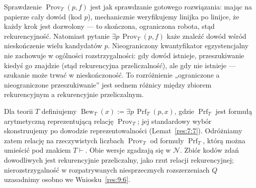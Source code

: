 \begin{przyklad}\label{res:6:6}
Sprawdzenie $\operatorname{Prov}_T(p,f)$ jest jak sprawdzanie gotowego rozwiązania: mając na papierze cały dowód (kod $p$), mechanicznie weryfikujemy linijka po linijce, że każdy krok jest dozwolony --- to skończona, ograniczona robota, stąd rekurencyjność. Natomiast pytanie $\exists p\,\operatorname{Prov}_T(p,f)$ każe znaleźć dowód wśród nieskończenie wielu kandydatów $p$. Nieograniczony kwantyfikator egzystencjalny nie zachowuje w ogólności rozstrzygalności: gdy dowód istnieje, przeszukiwanie kiedyś go znajdzie (stąd rekurencyjna przeliczalność), ale gdy nie istnieje --- szukanie może trwać w nieskończoność. To rozróżnienie „ograniczone a nieograniczone przeszukiwanie” jest sednem różnicy między zbiorem rekurencyjnym a rekurencyjnie przeliczalnym.
\end{przyklad}

\begin{definicja}\label{res:6:7}
Dla teorii $T$ definiujemy $\operatorname{Bew}_T(x):=\exists p\,\operatorname{Prf}_T(p,x)$, gdzie $\operatorname{Prf}_T$ jest formułą arytmetyczną reprezentującą relację $\operatorname{Prov}_T$; jej standardowy wybór skonstruujemy po dowodzie reprezentowalności (Lemat~\ref{res:7:7}). Odróżniamy zatem relację na rzeczywistych liczbach $\operatorname{Prov}_T$ od formuły $\operatorname{Prf}_T$, którą można umieścić pod znakiem $T\vdash$. Obie wersje zgadzają się w $\mathcal N$. Zbiór kodów zdań dowodliwych jest rekurencyjnie przeliczalny, jako rzut relacji rekurencyjnej; nierozstrzygalność w rozpatrywanych niesprzecznych rozszerzeniach $Q$ uzasadnimy osobno we Wniosku~\ref{res:9:6}.
\end{definicja}

